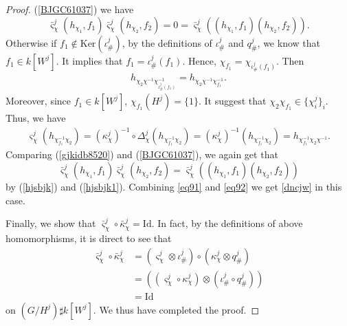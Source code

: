 \documentclass[11pt,reqno]{amsart}
\theoremstyle{definition}
\begin{document}
\begin{proof}
(\ref{BJGC61037}) we have
\begin{equation}\label{eq91}
 \bar{\varsigma}^{j}_{\chi}(h_{\chi_1}, f_1)\bar{\varsigma}^{j}_{\chi}(h_{\chi_2}, f_2) 
 =0
 = \bar{\varsigma}^{j}_{\chi} ((h_{\chi_1}, f_1) (h_{\chi_2}, f_2)).
\end{equation}
Otherwise if $f_1 \notin \mathrm{Ker}(\iota^j_{\#})$, 
by the definitions of $\iota^j_{\#}$ and $q^{j}_{\#}$, we know that 
$f_1 \in k[W^j]$. It implies that 
$f_1 = \iota^j_{\#}(f_1)$. Hence, 
$\chi_{f_1} = \chi_{\iota^j_{\#}(f_1)}$. Then 
\begin{align}\label{hjsbjk}
h_{\chi_2 \chi^{-1}\chi_{\iota^j_{\#}(f_1)}^{-1}} =  h_{\chi_2 \chi^{-1} \chi^{-1}_{f_1}}.
\end{align}
Moreover, since $f_1 \in k[W^j]$, 
$\chi_{f_1}(H^j) = \{1 \}$. It suggest that 
$\chi_{2}\chi_{f_1} \in \{ \chi_i^j \}_i$. 
Thus, we have 
\begin{align}\label{hjsbjk1}
\varsigma^{j}_{\chi}(h_{\chi^{-1}_{f_1} \chi_2} ) 
=  (\kappa^{j}_{\chi})^{-1}\circ \Delta^{j}_{\chi}(h_{\chi^{-1}_{f_1} \chi_2} ) 
= (\kappa^{j}_{\chi})^{-1}(h_{\chi^{-1}_{f_1} \chi_2} ) = h_{\chi^{-1}_{f_1} \chi_2 \chi^{-1}}.
\end{align}
Comparing (\ref{gjkidb8520}) and (\ref{BJGC61037}), we again get that  
\begin{equation}\label{eq92}
 \bar{\varsigma}^{j}_{\chi}(h_{\chi_1}, f_1)\bar{\varsigma}^{j}_{\chi}(h_{\chi_2}, f_2) 
 = \bar{\varsigma}^{j}_{\chi} ((h_{\chi_1}, f_1) (h_{\chi_2}, f_2)) 
\end{equation}
by (\ref{hjsbjk}) and (\ref{hjsbjk1}). 
Combining \eqref{eq91}
and \eqref{eq92} we get
\eqref{dncjw} in this case.

Finally, we show that 
$\bar\varsigma^{j}_{\chi} \circ \bar\kappa^{j}_{\chi} 
= \mathrm{Id}$.
In fact,
by the definitions of above homomorphisms, 
it is direct to see that 
\begin{align*}
\bar\varsigma^{j}_{\chi} \circ \bar\kappa^{j}_{\chi} & 
=  ( \varsigma^{j}_{\chi} \otimes \iota^j_{\#}) \circ (\kappa^{j}_{\chi} \otimes q^{j}_{\#}) \\
& = ((\varsigma^{j}_{\chi} \circ \kappa^{j}_{\chi}) \otimes (\iota^j_{\#} \circ  q^{j}_{\#}) ) \\ 
& = \mathrm{Id}  
\end{align*}
on $(G / H^j) \sharp k[W^{j}]$. 
We thus have completed the proof. 
\end{proof}
\end{document}
